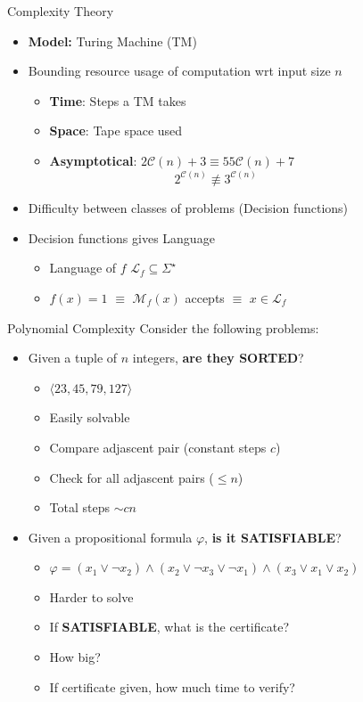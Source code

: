 \documentclass[usenames,dvipsnames]{beamer}
\newcommand{\cC}{\mathcal{C}}
\newcommand{\cL}{\mathcal{L}}
\newcommand{\cM}{\mathcal{M}}
\newcommand\ldiaarg[1]{\langle#1\rangle}
\begin{document}
\begin{frame}{Complexity Theory}
    \begin{itemize}
        \item \textbf{Model:} Turing Machine (TM)
        \item Bounding resource usage of computation wrt input size $n$
            \begin{itemize}
                \item \textbf{Time}: Steps a TM takes
                \item \textbf{Space}: Tape space used
                \item \textbf{Asymptotical}: $2\cC(n) + 3\equiv 55\cC(n) + 7$\\
                ~~~~~~~~~~~~~~~~~~~~$2^{\cC(n)}\not\equiv 3^{\cC(n)}$
            \end{itemize}
        \item Difficulty between classes of problems (Decision functions)
        \item Decision functions gives Language
        \begin{itemize}
            \item Language of $f$ $\cL_f\subseteq\Sigma^\star$
            \item $f(x) = 1$ $\equiv$ $\cM_f(x)$ accepts $\equiv$ $x\in \cL_f$
        \end{itemize}
    \end{itemize}
\end{frame}

\begin{frame}{Polynomial Complexity}
    Consider the following problems:
    \begin{itemize}
        \item Given a tuple of $n$ integers, \textbf{are they SORTED}?
        \begin{itemize}
            \item $\ldiaarg{23,45,79,127}$
            \item Easily solvable
            \item Compare adjascent pair (constant steps $c$)
            \item Check for all adjascent pairs ($\leq n$)
            \item Total steps $\sim cn$
        \end{itemize}
        \item Given a propositional formula $\varphi$, \textbf{is it SATISFIABLE}?
        \begin{itemize}
            \item $\varphi = (x_1\vee \neg x_2)\wedge (x_2\vee \neg x_3\vee \neg x_1)\wedge (x_3\vee x_1\vee x_2)$
            \item Harder to solve
            \item If \textbf{SATISFIABLE}, what is the certificate?
            \item How big?
            \item If certificate given, how much time to verify?
        \end{itemize}
    \end{itemize}
\end{frame}
\end{document}
